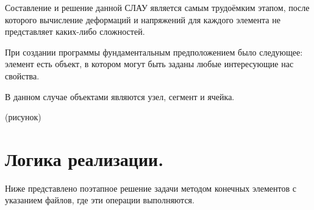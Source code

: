 \documentclass[a4paper,12pt]{article}
\begin{document}
Составление и решение данной СЛАУ является самым трудоёмким этапом, после которого вычисление деформаций и напряжений для каждого элемента не представляет каких-либо сложностей.


	При создании программы фундаментальным предположением было следующее: элемент есть объект, в котором могут быть заданы любые интересующие нас свойства. 

	В данном случае объектами являются узел, сегмент и ячейка.

	(рисунок)
 	
\section{Логика реализации.}   
	Ниже представлено поэтапное решение задачи методом конечных элементов с указанием файлов, где эти операции выполняются. 
\end{document}
